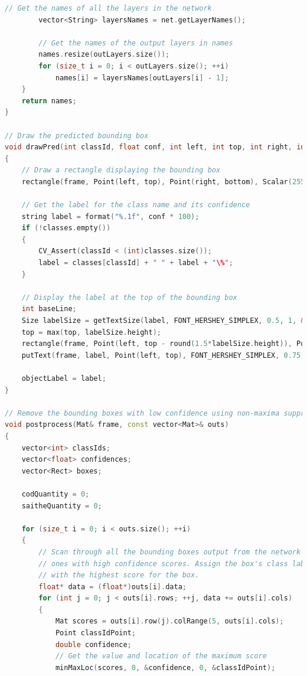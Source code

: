 \begin{lstlisting}[language=C++, caption=main.cpp]
        // Get the names of all the layers in the network
        vector<String> layersNames = net.getLayerNames();

        // Get the names of the output layers in names
        names.resize(outLayers.size());
        for (size_t i = 0; i < outLayers.size(); ++i)
            names[i] = layersNames[outLayers[i] - 1];
    }
    return names;
}

// Draw the predicted bounding box
void drawPred(int classId, float conf, int left, int top, int right, int bottom, Mat& frame)
{
    // Draw a rectangle displaying the bounding box
    rectangle(frame, Point(left, top), Point(right, bottom), Scalar(255, 178, 50), 3);

    // Get the label for the class name and its confidence
    string label = format("%.1f", conf * 100);
    if (!classes.empty())
    {
        CV_Assert(classId < (int)classes.size());
        label = classes[classId] + " " + label + "\%";
    }

    // Display the label at the top of the bounding box
    int baseLine;
    Size labelSize = getTextSize(label, FONT_HERSHEY_SIMPLEX, 0.5, 1, &baseLine);
    top = max(top, labelSize.height);
    rectangle(frame, Point(left, top - round(1.5*labelSize.height)), Point(left + round(1.5*labelSize.width), top + baseLine), Scalar(255, 255, 255), FILLED);
    putText(frame, label, Point(left, top), FONT_HERSHEY_SIMPLEX, 0.75, Scalar(0,0,0),1);

    objectLabel = label;
}

// Remove the bounding boxes with low confidence using non-maxima suppression
void postprocess(Mat& frame, const vector<Mat>& outs)
{
    vector<int> classIds;
    vector<float> confidences;
    vector<Rect> boxes;

    codQuantity = 0;
    saitheQuantity = 0;

    for (size_t i = 0; i < outs.size(); ++i)
    {
        // Scan through all the bounding boxes output from the network and keep only the
        // ones with high confidence scores. Assign the box's class label as the class
        // with the highest score for the box.
        float* data = (float*)outs[i].data;
        for (int j = 0; j < outs[i].rows; ++j, data += outs[i].cols)
        {
            Mat scores = outs[i].row(j).colRange(5, outs[i].cols);
            Point classIdPoint;
            double confidence;
            // Get the value and location of the maximum score
            minMaxLoc(scores, 0, &confidence, 0, &classIdPoint);


\end{lstlisting}

